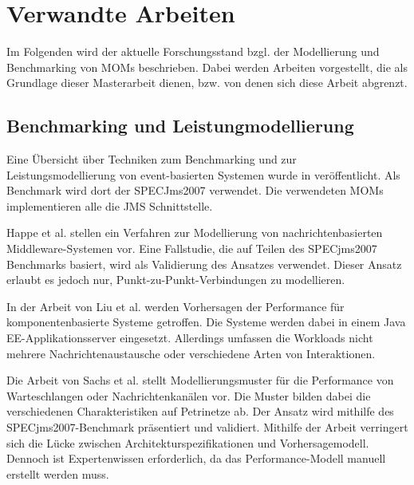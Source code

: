 
\chapter{Verwandte Arbeiten}
\label{ch:Verwandte}
Im Folgenden wird der aktuelle Forschungsstand bzgl. der Modellierung und Benchmarking von MOMs beschrieben. Dabei werden Arbeiten vorgestellt, die als Grundlage dieser Masterarbeit dienen, bzw. von denen sich diese Arbeit abgrenzt.

\section{Benchmarking und Leistungmodellierung}
Eine Übersicht über Techniken zum Benchmarking und zur Leistungsmodellierung von event-basierten Systemen wurde in \cite{Kounev2009} veröffentlicht. Als Benchmark wird dort der SPECJms2007 verwendet. Die verwendeten MOMs implementieren alle die JMS Schnittstelle. \par
Happe et al. \cite{happe} stellen ein Verfahren zur Modellierung von nachrichtenbasierten Middleware-Systemen vor. 
Eine Fallstudie, die auf Teilen des SPECjms2007 Benchmarks basiert, wird als Validierung des Ansatzes verwendet. Dieser Ansatz erlaubt es jedoch nur, Punkt-zu-Punkt-Verbindungen zu modellieren. \par
In der Arbeit von Liu et al. \cite{Liu2005} werden Vorhersagen der Performance für komponentenbasierte Systeme getroffen. Die Systeme werden dabei in einem Java EE-Applikationsserver eingesetzt. Allerdings umfassen die Workloads nicht mehrere Nachrichtenaustausche oder verschiedene Arten von Interaktionen. \par
Die Arbeit von Sachs et al. \cite{Sachs2013} stellt Modellierungsmuster für die Performance von Warteschlangen oder Nachrichtenkanälen vor. Die Muster bilden dabei die verschiedenen Charakteristiken auf Petrinetze ab. Der Ansatz wird mithilfe des \\ SPECjms2007-Benchmark präsentiert und validiert. Mithilfe der Arbeit verringert sich die Lücke zwischen Architekturspezifikationen und Vorhersagemodell. Dennoch ist Expertenwissen erforderlich, da das Performance-Modell manuell erstellt werden muss. \par
